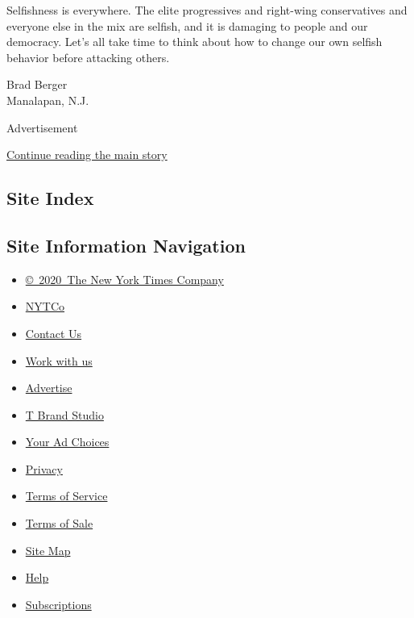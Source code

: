 Selfishness is everywhere. The elite progressives and right-wing
conservatives and everyone else in the mix are selfish, and it is
damaging to people and our democracy. Let's all take time to think about
how to change our own selfish behavior before attacking others.

Brad Berger\\
Manalapan, N.J.

Advertisement

\protect\hyperlink{after-bottom}{Continue reading the main story}

\hypertarget{site-index}{%
\subsection{Site Index}\label{site-index}}

\hypertarget{site-information-navigation}{%
\subsection{Site Information
Navigation}\label{site-information-navigation}}

\begin{itemize}
\tightlist
\item
  \href{https://help.nytimes.com/hc/en-us/articles/115014792127-Copyright-notice}{©~2020~The
  New York Times Company}
\end{itemize}

\begin{itemize}
\tightlist
\item
  \href{https://www.nytco.com/}{NYTCo}
\item
  \href{https://help.nytimes.com/hc/en-us/articles/115015385887-Contact-Us}{Contact
  Us}
\item
  \href{https://www.nytco.com/careers/}{Work with us}
\item
  \href{https://nytmediakit.com/}{Advertise}
\item
  \href{http://www.tbrandstudio.com/}{T Brand Studio}
\item
  \href{https://www.nytimes.com/privacy/cookie-policy\#how-do-i-manage-trackers}{Your
  Ad Choices}
\item
  \href{https://www.nytimes.com/privacy}{Privacy}
\item
  \href{https://help.nytimes.com/hc/en-us/articles/115014893428-Terms-of-service}{Terms
  of Service}
\item
  \href{https://help.nytimes.com/hc/en-us/articles/115014893968-Terms-of-sale}{Terms
  of Sale}
\item
  \href{https://spiderbites.nytimes.com}{Site Map}
\item
  \href{https://help.nytimes.com/hc/en-us}{Help}
\item
  \href{https://www.nytimes.com/subscription?campaignId=37WXW}{Subscriptions}
\end{itemize}
